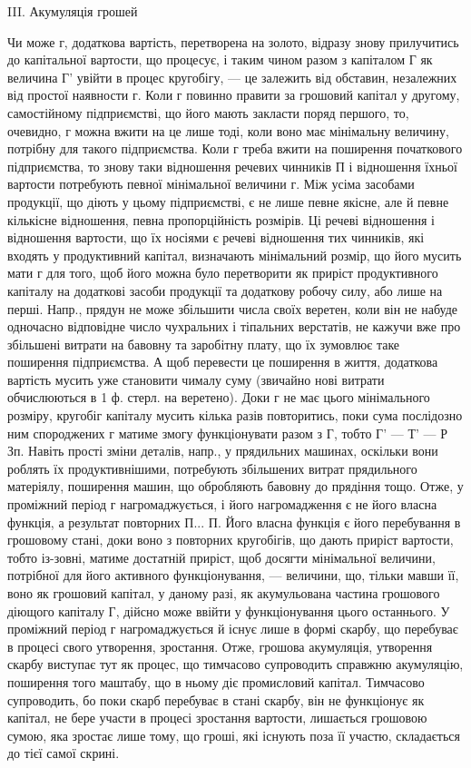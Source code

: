 III. Акумуляція грошей

Чи може г, додаткова вартість, перетворена на золото, відразу знову
прилучитись до капітальної вартости, що процесує, і таким чином разом
з капіталом Г як величина Г' увійти в процес кругобігу, — це залежить
від обставин, незалежних від простої наявности г. Коли г повинно правити
за грошовий капітал у другому, самостійному підприємстві, що його
мають закласти поряд першого, то, очевидно, г можна вжити на це
лише тоді, коли воно має мінімальну величину, потрібну для такого підприємства.
Коли г треба вжити на поширення початкового підприємства,
то знову таки відношення речевих чинників П і відношення їхньої
вартости потребують певної мінімальної величини г. Між усіма засобами
продукції, що діють у цьому підприємстві, є не лише певне якісне, але
й певне кількісне відношення, певна пропорційність розмірів. Ці
речеві відношення і відношення вартости, що їх носіями є речеві відношення
тих чинників, які входять у продуктивний капітал, визначають
мінімальний розмір, що його мусить мати г для того, щоб його можна
було перетворити як приріст продуктивного капіталу на додаткові засоби
продукції та додаткову робочу силу, або лише на перші. Напр., прядун
не може збільшити числа своїх веретен, коли він не набуде одночасно
відповідне число чухральних і тіпальних верстатів, не кажучи вже про
збільшені витрати на бавовну та заробітну плату, що їх зумовлює таке
поширення підприємства. А щоб перевести це поширення в життя, додаткова
вартість мусить уже становити чималу суму (звичайно нові
витрати обчислюються в 1 ф. стерл. на веретено). Доки г не має цього
мінімального розміру, кругобіг капіталу мусить кілька разів повторитись,
поки сума послідозно ним спороджених г матиме змогу функціонувати
разом з Г, тобто Г' — Т' — Р Зп. Навіть прості зміни деталів, напр., у прядильних машинах, оскільки
вони роблять їх продуктивнішими, потребують
збільшених витрат прядильного матеріялу, поширення машин, що
обробляють бавовну до прядіння тощо. Отже, у проміжний період г
нагромаджується, і його нагромадження є не його власна функція, а
результат повторних П... П. Його власна функція є його перебування в
грошовому стані, доки воно з повторних кругобігів, що дають приріст
вартости, тобто із-зовні, матиме достатній приріст, щоб досягти мінімальної
величини, потрібної для його активного функціонування, — величини,
що, тільки мавши її, воно як грошовий капітал, у даному разі, як акумульована
частина грошового діющого капіталу Г, дійсно може ввійти у функціонування
цього останнього. У проміжний період г нагромаджується й
існує лише в формі скарбу, що перебуває в процесі свого утворення, зростання.
Отже, грошова акумуляція, утворення скарбу виступає тут як процес,
що тимчасово супроводить справжню акумуляцію, поширення того маштабу,
що в ньому діє промисловий капітал. Тимчасово супроводить, бо
поки скарб перебуває в стані скарбу, він не функціонує як капітал, не
бере участи в процесі зростання вартости, лишається грошовою сумою,
яка зростає лише тому, що гроші, які існують поза її участю, складається
до тієї самої скрині.

